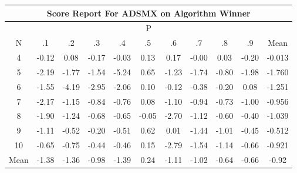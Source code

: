 \documentclass[11pt,a4paper]{report}
\begin{document}
\begin{longtable}{ | c || c | c | c | c | c | c | c | c | c || c |}
\hline
\multicolumn{11}{|c|}{ Score Report For ADSMX on Algorithm Winner} \\
\hline
\multicolumn{11}{|c|}{ P } \\
\hline
N & .1 & .2 & .3 & .4 & .5 & .6 & .7 & .8 & .9 & Mean\\
 \hline
 \hline
 \endhead
  4 &  \cellcolor[HTML]{FFFFFF} -0.12 &  \cellcolor[HTML]{FFFFFF} 0.08 &  \cellcolor[HTML]{FFF7F7} -0.17 &  \cellcolor[HTML]{FFFFFF} -0.03 &  \cellcolor[HTML]{FFFFFF} 0.13 &  \cellcolor[HTML]{F7F7FF} 0.17 &  \cellcolor[HTML]{FFFFFF} -0.00 &  \cellcolor[HTML]{FFFFFF} 0.03 &  \cellcolor[HTML]{FFF7F7} -0.20 & -0.013 \\
  5 &  \cellcolor[HTML]{FFC7C7} -2.19 &  \cellcolor[HTML]{FFCFCF} -1.77 &  \cellcolor[HTML]{FFD7D7} -1.54 &  \cellcolor[HTML]{FF7878} -5.24 &  \cellcolor[HTML]{EFEFFF} 0.65 &  \cellcolor[HTML]{FFDFDF} -1.23 &  \cellcolor[HTML]{FFD7D7} -1.74 &  \cellcolor[HTML]{FFE7E7} -0.80 &  \cellcolor[HTML]{FFCFCF} -1.98 & -1.760 \\
  6 &  \cellcolor[HTML]{FFD7D7} -1.55 &  \cellcolor[HTML]{FF9797} -4.19 &  \cellcolor[HTML]{FFB7B7} -2.95 &  \cellcolor[HTML]{FFCFCF} -2.06 &  \cellcolor[HTML]{FFFFFF} 0.10 &  \cellcolor[HTML]{FFFFFF} -0.12 &  \cellcolor[HTML]{FFF7F7} -0.38 &  \cellcolor[HTML]{FFF7F7} -0.20 &  \cellcolor[HTML]{FFFFFF} 0.08 & -1.251 \\
  7 &  \cellcolor[HTML]{FFC7C7} -2.17 &  \cellcolor[HTML]{FFDFDF} -1.15 &  \cellcolor[HTML]{FFE7E7} -0.84 &  \cellcolor[HTML]{FFEFEF} -0.76 &  \cellcolor[HTML]{FFFFFF} 0.08 &  \cellcolor[HTML]{FFE7E7} -1.10 &  \cellcolor[HTML]{FFE7E7} -0.94 &  \cellcolor[HTML]{FFEFEF} -0.73 &  \cellcolor[HTML]{FFE7E7} -1.00 & -0.956 \\
  8 &  \cellcolor[HTML]{FFCFCF} -1.90 &  \cellcolor[HTML]{FFDFDF} -1.24 &  \cellcolor[HTML]{FFEFEF} -0.68 &  \cellcolor[HTML]{FFEFEF} -0.65 &  \cellcolor[HTML]{FFFFFF} -0.05 &  \cellcolor[HTML]{FFBFBF} -2.70 &  \cellcolor[HTML]{FFDFDF} -1.12 &  \cellcolor[HTML]{FFEFEF} -0.60 &  \cellcolor[HTML]{FFF7F7} -0.40 & -1.039 \\
  9 &  \cellcolor[HTML]{FFE7E7} -1.11 &  \cellcolor[HTML]{FFEFEF} -0.52 &  \cellcolor[HTML]{FFF7F7} -0.20 &  \cellcolor[HTML]{FFEFEF} -0.51 &  \cellcolor[HTML]{EFEFFF} 0.62 &  \cellcolor[HTML]{FFFFFF} 0.01 &  \cellcolor[HTML]{FFD7D7} -1.44 &  \cellcolor[HTML]{FFE7E7} -1.01 &  \cellcolor[HTML]{FFF7F7} -0.45 & -0.512 \\
  10 &  \cellcolor[HTML]{FFEFEF} -0.65 &  \cellcolor[HTML]{FFEFEF} -0.75 &  \cellcolor[HTML]{FFF7F7} -0.44 &  \cellcolor[HTML]{FFF7F7} -0.46 &  \cellcolor[HTML]{FFFFFF} 0.15 &  \cellcolor[HTML]{FFB7B7} -2.79 &  \cellcolor[HTML]{FFD7D7} -1.54 &  \cellcolor[HTML]{FFDFDF} -1.14 &  \cellcolor[HTML]{FFEFEF} -0.66 & -0.921 \\
 \hline
 \hline
Mean &  \cellcolor[HTML]{FFDFDF} -1.38 &  \cellcolor[HTML]{FFDFDF} -1.36 &  \cellcolor[HTML]{FFE7E7} -0.98 &  \cellcolor[HTML]{FFDFDF} -1.39 &  \cellcolor[HTML]{F7F7FF} 0.24 &  \cellcolor[HTML]{FFE7E7} -1.11 &  \cellcolor[HTML]{FFE7E7} -1.02 &  \cellcolor[HTML]{FFEFEF} -0.64 &  \cellcolor[HTML]{FFEFEF} -0.66 &  \cellcolor[HTML]{FFE7E7} -0.92
\end{longtable}
\end{document}
